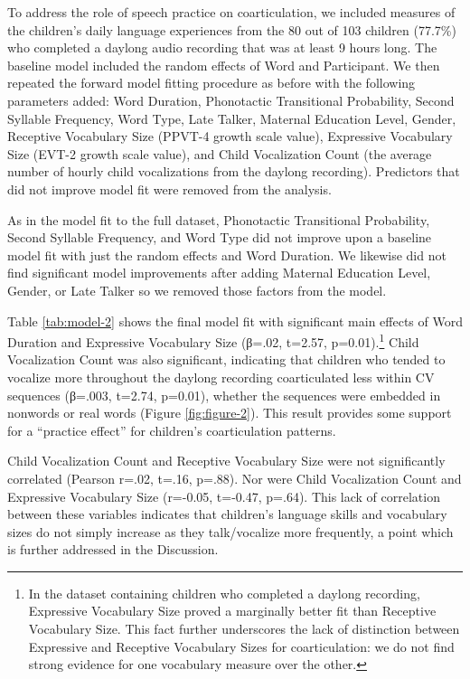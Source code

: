 \documentclass[a4paper,man,natbib,donotrepeattitle, apacite]{apa6}
\begin{document}
To address the role of speech practice on coarticulation, we included measures of the children’s daily language experiences from the 80 out of 103 children (77.7\%) who completed a daylong audio recording that was at least 9 hours long. The baseline model included the random effects of Word and Participant. We then repeated the forward model fitting procedure as before with the following parameters added: Word Duration, Phonotactic Transitional Probability, Second Syllable Frequency, Word Type, Late Talker, Maternal Education Level, Gender, Receptive Vocabulary Size (PPVT-4 growth scale value), Expressive Vocabulary Size (EVT-2 growth scale value), and Child Vocalization Count (the average number of hourly child vocalizations from the daylong recording). Predictors that did not improve model fit were removed from the analysis. 

As in the model fit to the full dataset, Phonotactic Transitional Probability, Second Syllable Frequency, and Word Type did not improve upon a baseline model fit with just the random effects and Word Duration. We likewise did not find significant model improvements after adding Maternal Education Level, Gender, or Late Talker so we removed those factors from the model. 

Table \ref{tab:model-2} shows the final model fit with significant main effects of Word Duration and Expressive Vocabulary Size (β=.02, t=2.57, p=0.01).\footnote{In the dataset containing children who completed a daylong recording, Expressive Vocabulary Size proved a marginally better fit than Receptive Vocabulary Size. This fact further underscores the lack of distinction between Expressive and Receptive Vocabulary Sizes for coarticulation: we do not find strong evidence for one vocabulary measure over the other.} Child Vocalization Count was also significant, indicating that children who tended to vocalize more throughout the daylong recording coarticulated less within CV sequences (β=.003, t=2.74, p=0.01), whether the sequences were embedded in nonwords or real words (Figure \ref{fig:figure-2}). This result provides some support for a ``practice effect'' for children’s coarticulation patterns.

Child Vocalization Count and Receptive Vocabulary Size were not significantly correlated (Pearson r=.02, t=.16, p=.88). Nor were Child Vocalization Count and Expressive Vocabulary Size (r=-0.05, t=-0.47, p=.64). This lack of correlation between these variables indicates that children’s language skills and vocabulary sizes do not simply increase as they talk/vocalize more frequently, a point which is further addressed in the Discussion.
\end{document}
